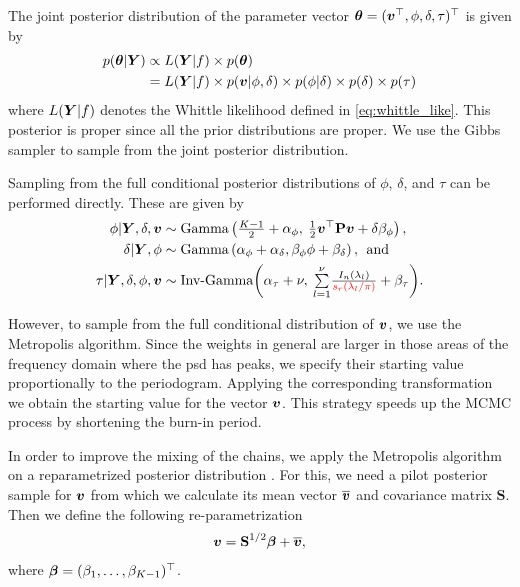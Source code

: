 \documentclass[twocolumn,final]{svjour3}
\newcommand{\bm}[1]{\mbox{\boldmath $#1$}}
\newcommand{\pmr}{ \color{red}}
\begin{document}
The  joint posterior distribution of the parameter vector $\bm{\theta} = (\bm{v}^\top, \phi, \delta, \tau)^\top$ is given by
\begin{align*}
p(\bm{\theta}|\bm{Y}) & \propto L(\bm{Y}|f) \times p(\bm{\theta})  \\
&= L(\bm{Y}|f) \times p(\bm{v}|\phi, \delta) \times p(\phi|\delta) \times p(\delta) \times p(\tau)
\end{align*}
where $ L(\bm{Y}|f) $ denotes the Whittle likelihood defined in \eqref{eq:whittle_like}.
This posterior is proper since all the prior distributions are proper.  
We use the Gibbs sampler to sample from the joint posterior distribution.

Sampling from the full conditional posterior distributions of $\phi$, $\delta$, and $\tau$ can be performed directly. These are given by
\begin{align*}
\phi|\bm{Y},\delta,\bm{v} &\sim \text{Gamma}\left(\tfrac{K-1}{2} + \alpha_{\phi},\: \tfrac{1}{2} \bm{v}^\top \textbf{P} \bm{v} + \delta \beta_{\phi} \right), \\
\delta|\bm{Y},\phi  &\sim \text{Gamma}\left(\alpha_{\phi} + \alpha_{\delta}, \beta_{\phi} \phi + \beta_{\delta}\right),\:\: \text{and}\\
\tau|\bm{Y},\delta, \phi,\bm{v}   &\sim \text{Inv-Gamma}\!\left(\alpha_{\tau}+ \nu,\:  {\textstyle\sum\limits_{l=1}^{\nu}} \tfrac{I_n(\lambda_l)}{{\pmr s_r(\lambda_l/\pi)}} + \beta_{\tau} \right)\!.
\end{align*}

However, to sample from the full conditional distribution of $\bm{v}$, we use the Metropolis algorithm.
Since the weights in general are larger in those areas of the frequency domain where the psd has peaks, we specify their starting value proportionally to the periodogram. Applying the corresponding transformation we obtain the starting value for the vector $\bm{v}$.  This strategy speeds up the MCMC process by shortening the burn-in period.

In order to improve the mixing of the chains, we apply the Metropolis algorithm on a reparametrized posterior distribution \citep{Lambert:2007}.  For this, we need a pilot posterior sample for $\bm{v}$ from which we calculate its mean vector $\bm{\overline{v}}$ and covariance matrix $\textbf{S}$.  Then we define the following re-parametrization
\begin{align*}
\bm{v} = \textbf{S}^{1/2} \bm{\beta} + \overline{\bm{v}},
\end{align*}
where $\bm{\beta}=(\beta_1, \dots, \beta_{K-1})^\top$.
\end{document}
